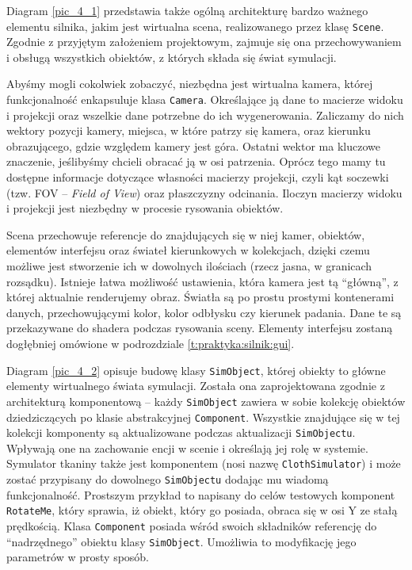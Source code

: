 		
		Diagram \ref{pic_4_1} przedstawia także ogólną architekturę bardzo ważnego elementu silnika, jakim jest wirtualna scena, realizowanego przez klasę \texttt{Scene}. Zgodnie z przyjętym założeniem projektowym, zajmuje się ona przechowywaniem i obsługą wszystkich obiektów, z których składa się świat symulacji. 
		
		Abyśmy mogli cokolwiek zobaczyć, niezbędna jest wirtualna kamera, której funkcjonalność enkapsuluje klasa \texttt{Camera}. Określające ją dane to macierze widoku i projekcji oraz wszelkie dane potrzebne do ich wygenerowania. Zaliczamy do nich wektory pozycji kamery, miejsca, w które patrzy się kamera, oraz kierunku obrazującego, gdzie względem kamery jest góra. Ostatni wektor ma kluczowe znaczenie, jeślibyśmy chcieli obracać ją w osi patrzenia. Oprócz tego mamy tu dostępne informacje dotyczące własności macierzy projekcji, czyli kąt soczewki (tzw. FOV -- \emph{Field of View}) oraz płaszczyzny odcinania. Iloczyn macierzy widoku i projekcji jest niezbędny w procesie rysowania obiektów.
		
		Scena przechowuje referencje do znajdujących się w niej kamer, obiektów, elementów interfejsu oraz świateł kierunkowych w kolekcjach, dzięki czemu możliwe jest stworzenie ich w dowolnych ilościach (rzecz jasna, w granicach rozsądku). Istnieje łatwa możliwość ustawienia, która kamera jest tą ``główną'', z której aktualnie renderujemy obraz. Światła są po prostu prostymi kontenerami danych, przechowującymi kolor, kolor odbłysku czy kierunek padania. Dane te są przekazywane do shadera podczas rysowania sceny. Elementy interfejsu zostaną dogłębniej omówione w podrozdziale \ref{t:praktyka:silnik:gui}.
		
		Diagram \ref{pic_4_2} opisuje budowę klasy \texttt{SimObject}, której obiekty to główne elementy wirtualnego świata symulacji. Została ona zaprojektowana zgodnie z architekturą komponentową -- każdy \texttt{SimObject} zawiera w sobie kolekcję obiektów dziedziczących po klasie abstrakcyjnej \texttt{Component}. Wszystkie znajdujące się w tej kolekcji komponenty są aktualizowane podczas aktualizacji \texttt{SimObjectu}. Wpływają one na zachowanie encji w scenie i określają jej rolę w systemie. Symulator tkaniny także jest komponentem (nosi nazwę \texttt{ClothSimulator}) i może zostać przypisany do dowolnego \texttt{SimObjectu} dodając mu wiadomą funkcjonalność. Prostszym przykład to napisany do celów testowych komponent \texttt{RotateMe}, który sprawia, iż obiekt, który go posiada, obraca się w osi Y ze stałą prędkością. Klasa \texttt{Component} posiada wśród swoich składników referencję do ``nadrzędnego'' obiektu klasy \texttt{SimObject}. Umożliwia to modyfikację jego parametrów w prosty sposób.
		
